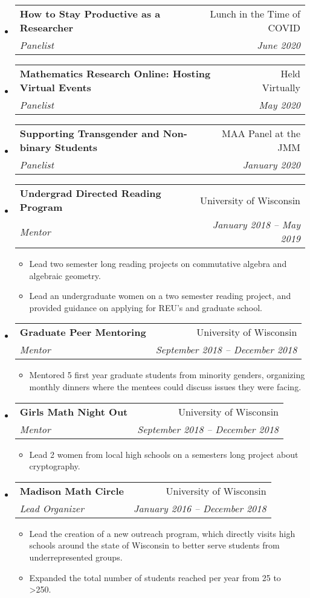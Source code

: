 \documentclass[letterpaper,11pt]{article}
\makeatletter
\newcommand{\resitem}[1]{\item #1 \vspace{-2pt}}
\newcommand{\ressubheading}[4]{
\begin{tabular*}{6.5in}[t]{l@{\cftdotfill{\cftsecdotsep}\extracolsep{\fill}}r}
		\textbf{#1} & #2 \\
		\textit{#3} & \textit{#4} \\
\end{tabular*}\vspace{-6pt}}
\makeatother
\begin{document}
\begin{itemize}

\item 
	\ressubheading{How to Stay Productive as a Researcher}{Lunch in the Time of COVID}{Panelist}{June 2020}

\item 
	\ressubheading{Mathematics Research Online: Hosting Virtual Events}{Held Virtually}{Panelist}{May 2020}

\item 
	\ressubheading{Supporting Transgender and Non-binary Students}{MAA Panel at the JMM}{Panelist}{January 2020}
	
\item 
	\ressubheading{Undergrad Directed Reading Program}{University of Wisconsin}{Mentor}{January 2018 -- May 2019}
	\begin{itemize}
		\resitem{Lead two semester long reading projects on commutative algebra and algebraic geometry.}
		\resitem{Lead an undergraduate women on a two semester reading project, and provided guidance on applying for REU's and graduate school.}
	\end{itemize}
	
\item 
	\ressubheading{Graduate Peer Mentoring}{University of Wisconsin}{Mentor}{September 2018 -- December 2018}
	\begin{itemize}
		\resitem{Mentored 5 first year graduate students from minority genders, organizing monthly dinners where the mentees could discuss issues they were facing.}
	\end{itemize}
		
\item 
	\ressubheading{Girls Math Night Out}{University of Wisconsin}{Mentor}{September 2018 -- December 2018}
	\begin{itemize}
		\resitem{Lead 2 women from local high schools on a semesters long project about cryptography.}
	\end{itemize}

\item 
	\ressubheading{Madison Math Circle}{University of Wisconsin}{Lead Organizer}{January 2016 -- December 2018}
	\begin{itemize}
		\resitem{Lead the creation of a new outreach program, which directly visits high schools around the state of Wisconsin to better serve students from underrepresented groups.}
		\resitem{Expanded the total number of students reached per year from 25 to >250.}
	\end{itemize}


\end{itemize}
\end{document}
